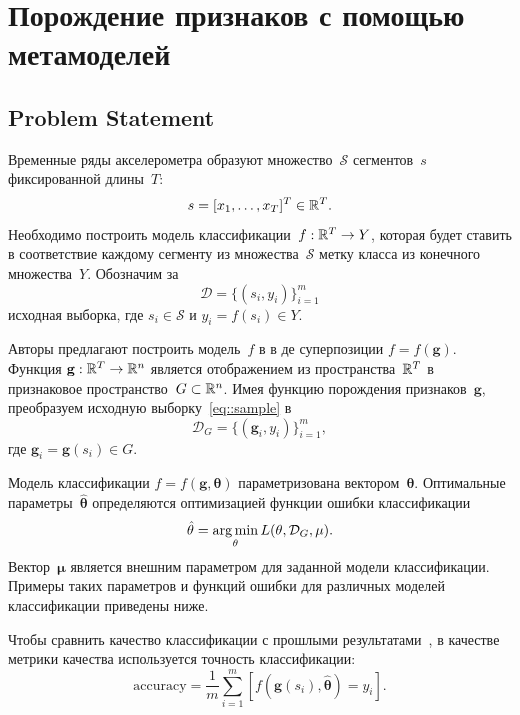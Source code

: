 \chapter{Порождение признаков с помощью метамоделей}


\section{Problem Statement}
Временные ряды акселерометра образуют множество~$\mathcal{S}$ сегментов~$s$ фиксированной длины~$T$:
\begin{equation}
s = [x_1, \dots, x_T]^{T} \in \mathbb{R}^T.
\label{eq::time_series}
\end{equation}
Необходимо построить модель классификации~$f: \mathbb{R}^T \rightarrow Y$, которая будет ставить в соответствие каждому сегменту из множества~$\mathcal{S}$ метку класса из конечного множества~$Y$.
Обозначим за
\begin{equation}
	\mathcal{D} = \{(s_i, y_i)\}_{i=1}^m
	\label{eq::sample}
\end{equation}
исходная выборка, где $s_i \in \mathcal{S}$ и $y_i = f(s_i)\in Y$.

Авторы предлагают построить модель~$f$ в в де суперпозиции $f=f(\mathbf{g})$.
Функция $\mathbf{g}: \mathbb{R}^T \rightarrow \mathbb{R}^n$ является отображением из пространства~$\mathbb{R}^{T} $ в признаковое пространство~$G \subset \mathbb{R}^n$.
Имея функцию порождения признаков~$\mathbf{g}$, преобразуем исходную выборку~\eqref{eq::sample} в
\[
	\mathcal{D}_G = \{(\mathbf{g}_i, y_i)\}_{i=1}^m,
\]
где $\mathbf{g}_i = \mathbf{g}(s_i) \in G$. 

Модель классификации $f=f(\mathbf{g}, \mathbf{\theta})$ параметризована вектором~$\boldsymbol{\theta}$. 
Оптимальные параметры~$\hat{\mathbf{\theta}}$ определяются оптимизацией функции ошибки классификации
\begin{equation}
\hat{\mathbf{\theta}} = \mathop{\arg \min}\limits_{\mathbf{\theta}} L(\mathbf{\theta}, \mathcal{D}_G, \mathbf{\mu}).
\label{eq::optimal_classification_params}
\end{equation}
Вектор~$\mathbf{\mu}$ является внешним параметром для заданной модели классификации. 
Примеры таких параметров и функций ошибки для различных моделей классификации приведены ниже.

Чтобы сравнить качество классификации с прошлыми результатами~\cite{karasikov2016feature,ivkin2015ts}, в качестве метрики качества используется точность классификации:
\begin{equation}
	\mathrm{accuracy} = \frac{1}{m} \sum_{i=1}^{m} \left[f\left(\mathbf{g}(s_i), \hat{\mathbf{\theta}} \right)= y_i\right].
	\label{eq::accuracy}
\end{equation}

